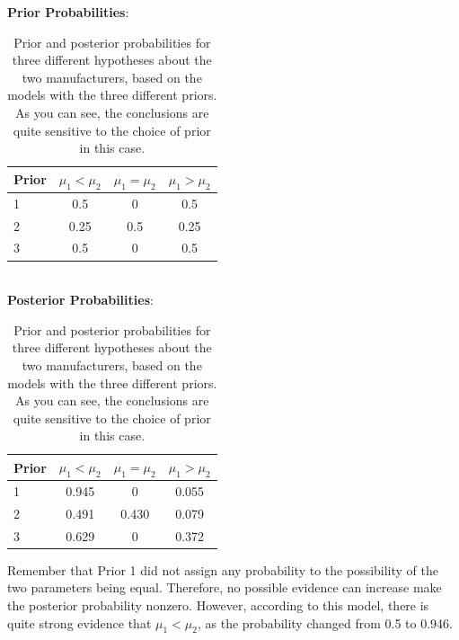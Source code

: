 \begin{table}
\begin{center}
{\bf Prior Probabilities}:\\
\begin{tabular}{|l|c|c|c|}
\hline
Prior	&	$\mu_1 < \mu_2$	& $\mu_1 = \mu_2$	& $\mu_1 > \mu_2$\\
\hline
1 	&	0.5		&	0		&	0.5\\
2 	&	0.25		&	0.5		&	0.25\\
3 	&	0.5		&	0		&	0.5\\
\hline
\end{tabular}\\
{\bf Posterior Probabilities}:\\
\begin{tabular}{|l|c|c|c|}
\hline
Prior	&	$\mu_1 < \mu_2$	& $\mu_1 = \mu_2$	& $\mu_1 > \mu_2$\\
\hline
1 	&	0.945		&	0		&	0.055\\
2 	&	0.491		&	0.430		&	0.079\\
3 	&	0.629		&	0		&	0.372\\
\hline
\end{tabular}
\caption{Prior and posterior probabilities for three different hypotheses about
the two manufacturers, based on the models with the three different priors.
As you can see, the conclusions are quite sensitive to the choice of prior in
this case.
\label{tab:ttest_results}}
\end{center}
\end{table}

Remember that Prior 1 did not assign any probability to the possibility of the
two parameters being equal. Therefore, no possible evidence can increase
make the posterior probability nonzero. However, according to this model, there
is quite strong evidence that $\mu_1 < \mu_2$, as the probability changed from
0.5 to 0.946.

